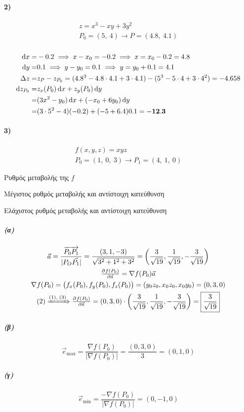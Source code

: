 \documentclass[11pt,a4paper,titlepage,draft]{article}
\begin{document}
\paragraph{2)}
\begin{gather*}
z=x^3-xy+3y^2\\
P_0=(5,\ 4) \rightarrow P=(4.8,\ 4.1)
\end{gather*}
\subparagraph{}
\begin{align*}
\dif x =& -0.2 \implies x-x_0 = -0.2 \implies x=x_0-0.2=4.8\\
\dif y =&  0.1 \implies y-y_0 =  0.1 \implies y=y_0+0.1=4.1\\
\Delta z =& z_P -z_{P_0} = (4.8^3-4.8\cdot4.1+3\cdot4.1)-(5^3-5\cdot 4 + 3 \cdot 4^2) = -4.658\\
\dif z_{P_0} =& z_x(P_0)\dif x + z_y(P_0)\dif y \\
=&(3x^2-y_0)\dif x+(-x_0+6y_0)\dif y\\
=& (3\cdot5^2-4)(-0.2)+(-5+6.4)0.1 = \mathbf{-12.3}
\end{align*}

\paragraph{3)}
\begin{gather*}
f(x,y,z)=xyz\\
P_0=(1,\ 0,\ 3) \rightarrow P_1 =(4,\ 1,\ 0)
\end{gather*}
\begin{enumparen}
\item Ρυθμός μεταβολής της $f$
\item Μέγιστος ρυθμός μεταβολής και αντίστοιχη κατεύθυνση
\item Ελάχιστος ρυθμός μεταβολής και αντίστοιχη κατεύθυνση
\end{enumparen}
\subparagraph{(α)}
\begin{gather}
\vec a = \frac{\overrightarrow{P_0P_1}}{|P_O\vec{P_1}|}=\frac{(3,1,-3)}{\sqrt{3^2+1^2+3^2}}=\left(
\frac{3}{\sqrt{19}},\frac{1}{\sqrt{19}},-\frac{3}{\sqrt{19}}
\right)\\
\pd{f(P_0)}{\vec a} = \nabla f(P_0)\vec a\\
\nabla f(P_0) = \left(f_x(P_0),f_y(P_0),f_z(P_0)\right) = (y_0z_0,x_0z_0,x_0y_0) = (0,3,0)
\\
(2)\xRightarrow{(1),\; (3)}\pd{f(P_0)}{\vec{a}} = (0,3,0)\cdot\left(
\frac{3}{\sqrt{19}},\frac{1}{\sqrt{19}},-\frac{3}{\sqrt{19}}\right)=\boxed{\frac{3}{\sqrt{19}}}
\end{gather}
\subparagraph{(β)}
\[
\vec e_{\max} = \frac{\nabla f(P_0)}{\left| \nabla f(P_0) \right|}=\frac{(0,3,0)}{3}=(0,1,0)
\]
\subparagraph{(γ)}
\[
\vec e_{\min} = \frac{-\nabla f(P_0)}{|\nabla f(P_0)|}=(0,-1,0)
\]
\end{document}

